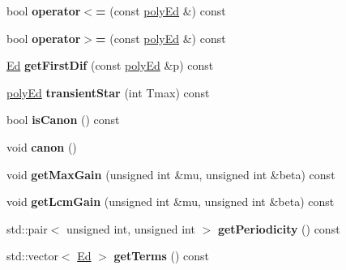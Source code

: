 \begin{DoxyCompactItemize}
bool {\bfseries operator$<$=} (const \mbox{\hyperlink{classetvo_i_i_1_1poly_ed}{poly\+Ed}} \&) const
\item 
\mbox{\label{classetvo_i_i_1_1poly_ed_ac5c27b9d6d6770a9f95fde3e96ca7cc6}} 
bool {\bfseries operator$>$=} (const \mbox{\hyperlink{classetvo_i_i_1_1poly_ed}{poly\+Ed}} \&) const
\item 
\mbox{\label{classetvo_i_i_1_1poly_ed_a6d31374d35b4b63529dd67648aa4896b}} 
\mbox{\hyperlink{classetvo_i_i_1_1_ed}{Ed}} {\bfseries get\+First\+Dif} (const \mbox{\hyperlink{classetvo_i_i_1_1poly_ed}{poly\+Ed}} \&p) const
\item 
\mbox{\label{classetvo_i_i_1_1poly_ed_a7347edf67ed722e6e8ff6fea0a85d5f6}} 
\mbox{\hyperlink{classetvo_i_i_1_1poly_ed}{poly\+Ed}} {\bfseries transient\+Star} (int Tmax) const
\item 
\mbox{\label{classetvo_i_i_1_1poly_ed_a5c96b87637668d0e7e94444cf96e42f9}} 
bool {\bfseries is\+Canon} () const
\item 
\mbox{\label{classetvo_i_i_1_1poly_ed_a7b31e5b470be0d0ade9df3db49f89d83}} 
void {\bfseries canon} ()
\item 
\mbox{\label{classetvo_i_i_1_1poly_ed_a88c754e2079f6747911488cb4c944873}} 
void {\bfseries get\+Max\+Gain} (unsigned int \&mu, unsigned int \&beta) const
\item 
\mbox{\label{classetvo_i_i_1_1poly_ed_aeb407a22f80a8ea93326d57e4a9dddcb}} 
void {\bfseries get\+Lcm\+Gain} (unsigned int \&mu, unsigned int \&beta) const
\item 
\mbox{\label{classetvo_i_i_1_1poly_ed_a3477d58052e65589deecd65cdf84ea54}} 
std\+::pair$<$ unsigned int, unsigned int $>$ {\bfseries get\+Periodicity} () const
\item 
\mbox{\label{classetvo_i_i_1_1poly_ed_ac646be88247752e34c150be845fea1a4}} 
std\+::vector$<$ \mbox{\hyperlink{classetvo_i_i_1_1_ed}{Ed}} $>$ {\bfseries get\+Terms} () const
\item 

\end{DoxyCompactItemize}
